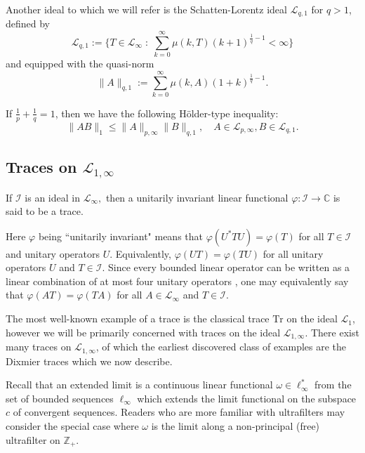     Another ideal to which we will refer is the Schatten-Lorentz ideal $\mathcal{L}_{q,1}$ for $q > 1$, defined by
    \begin{equation*}
        \mathcal{L}_{q,1} := \{T \in \mathcal{L}_\infty\;:\;\sum_{k=0}^\infty \mu(k,T)(k+1)^{\frac{1}{q}-1} < \infty\}
    \end{equation*}
    and equipped with the quasi-norm
    \begin{equation*}
        \|A\|_{q,1} := \sum_{k=0}^\infty \mu(k,A)(1+k)^{\frac{1}{q}-1}.
    \end{equation*}

    If $\frac{1}{p}+\frac{1}{q} = 1$, then we have the following H\"older-type inequality:
    \begin{equation}\label{another holder}
        \|AB\|_1 \leq \|A\|_{p,\infty}\|B\|_{q,1},\quad A \in \mathcal{L}_{p,\infty}, B \in \mathcal{L}_{q,1}.
    \end{equation}


\subsection{Traces on $\mathcal{L}_{1,\infty}$}\label{trace subsection}

    \begin{defi}\label{trace def} 
        If $\mathcal{I}$ is an ideal in $\mathcal{L}_{\infty},$ then a unitarily invariant
        linear functional $\varphi:\mathcal{I}\to\mathbb{C}$ is said to be a trace.
    \end{defi}
    Here $\varphi$ being ``unitarily invariant" means that $\varphi(U^*TU) = \varphi(T)$ for all $T \in \mathcal{I}$ and unitary operators $U$. 
    Equivalently, $\varphi(UT) = \varphi(TU)$ for all unitary operators $U$ and $T \in \mathcal{I}$. Since every bounded linear operator can be written as a linear combination
    of at most four unitary operators \cite[Page 209]{Reed-Simon-I-1980}, one may equivalently say that $\varphi(AT) = \varphi(TA)$ for all $A \in \mathcal{L}_{\infty}$
    and $T \in \mathcal{I}$.
    
    The most well-known example of a trace is the classical trace $\mathrm{Tr}$ on the ideal $\mathcal{L}_1$, however we will be primarily concerned with traces on the ideal $\mathcal{L}_{1,\infty}$. 
    There exist many traces on $\mathcal{L}_{1,\infty}$, of which the earliest discovered class of examples are the Dixmier traces which we now describe.
    
    Recall that an extended limit is a continuous linear functional $\omega \in \ell_\infty^*$ from the set of bounded sequences $\ell_\infty$
    which extends the limit functional on the subspace $c$ of convergent sequences. Readers who are more familiar with ultrafilters may consider
    the special case where $\omega$ is the limit along a non-principal (free) ultrafilter on $\mathbb{Z}_+$.
    

